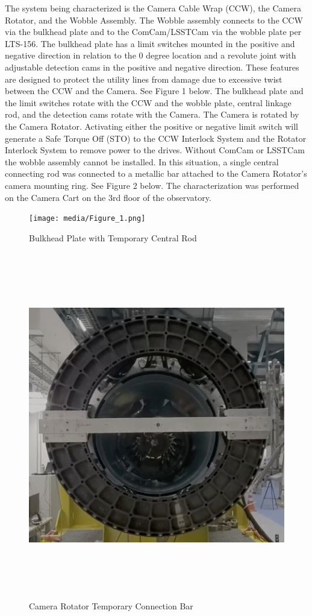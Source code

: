 \documentclass[SE,lsstdraft,authoryear,toc]{lsstdoc}
\begin{document}
The system being characterized is the Camera Cable Wrap (CCW), the
Camera Rotator, and the Wobble Assembly. The Wobble assembly connects to
the CCW via the bulkhead plate and to the ComCam/LSSTCam via the wobble
plate per LTS-156. The bulkhead plate has a limit switches mounted in
the positive and negative direction in relation to the 0 degree location
and a revolute joint with adjustable detection cams in the positive and
negative direction. These features are designed to protect the utility
lines from damage due to excessive twist between the CCW and the Camera.
See Figure 1 below. The bulkhead plate and the limit switches rotate
with the CCW and the wobble plate, central linkage rod, and the
detection cams rotate with the Camera. The Camera is rotated by the
Camera Rotator. Activating either the positive or negative limit switch
will generate a Safe Torque Off (STO) to the CCW Interlock System and
the Rotator Interlock System to remove power to the drives. Without
ComCam or LSSTCam the wobble assembly cannot be installed. In this
situation, a single central connecting rod was connected to a metallic
bar attached to the Camera Rotator's camera mounting ring. See Figure 2
below. The characterization was performed on the Camera Cart on the 3rd
floor of the observatory.

\begin{figure}[h!]
  \texttt{[image: media/Figure\_1.png]}
  \caption{Bulkhead Plate with Temporary Central Rod}
  \label{fig:Figure_1}
\end{figure}

\begin{figure}[h!]
  \includegraphics[width=6.5in,height=5.96389in]{media/Figure_2.png}
  \caption{Camera Rotator Temporary Connection Bar}
  \label{fig:Figure_2}
\end{figure}
\end{document}
